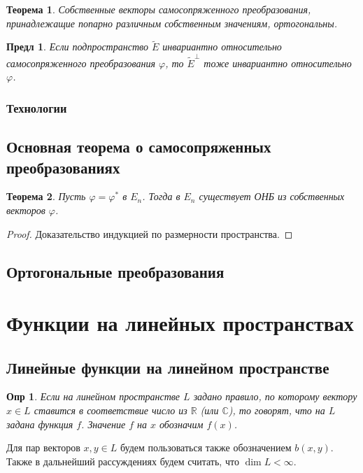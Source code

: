 \documentclass[a4paper,12pt]{article}
\newtheorem*{definition}{Опр}
\newtheorem{theorem}{Теорема}[section]
\newtheorem{propos}{Предл}[section]
\begin{document}
\begin{theorem}
	Собственные векторы самосопряженного преобразования, принадлежащие попарно различным собственным значениям, ортогональны.
\end{theorem}

\begin{propos}
	Если подпространство $\tilde{E}$ инвариантно относительно самосопряженного преобразования $\varphi$, то $\tilde{E}^{\perp}$ тоже инвариантно относительно $\varphi$.
\end{propos}

\subsubsection{Технологии}

\subsection{Основная теорема о самосопряженных преобразованиях}
\begin{theorem}
	Пусть $\varphi = \varphi^*$ в $E_n$. Тогда в $E_n$ существует ОНБ из собственных векторов $\varphi$.
\end{theorem}
\begin{proof}
	Доказательство индукцией по размерности пространства.
\end{proof}

\subsection{Ортогональные преобразования}

\section{Функции на линейных пространствах}
\subsection{Линейные функции на линейном пространстве}

\begin{definition}
	Если на линейном пространстве $L$ задано правило, по которому вектору $x \in L$ ставится в соответствие число из $\mathbb{R}$ (или $\mathbb{C}$), то говорят, что на $L$  задана функция $f$. Значение $f$ на $x$ обозначим $f(x)$.
\end{definition}

Для пар векторов $x,y \in L$ будем пользоваться также обозначением $b(x,y)$. Также в дальнейший рассуждениях будем считать, что $\dim L < \infty$.
\end{document}
